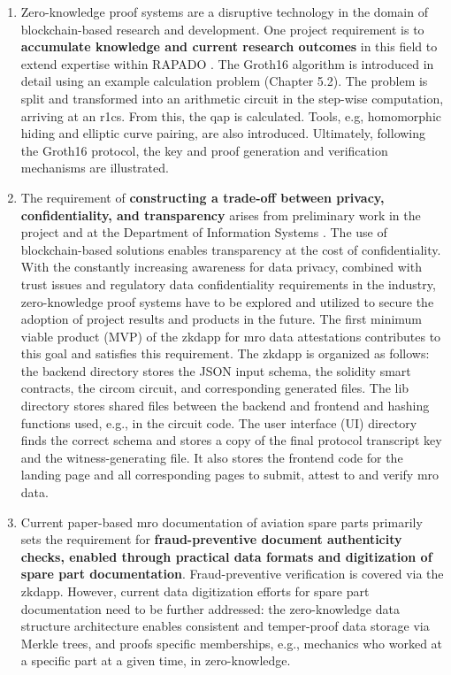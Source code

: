 \begin{enumerate}
    \item Zero-knowledge proof systems are a disruptive technology in the domain of blockchain-based research and development. One project requirement is to \textbf{accumulate knowledge and current research outcomes} in this field to extend expertise within RAPADO \citep{ZedelJ}. The Groth16 algorithm is introduced in detail using an example calculation problem (Chapter 5.2). The problem is split and transformed into an arithmetic circuit in the step-wise computation, arriving at an \acrshort{r1cs}. From this, the \acrshort{qap} is calculated. Tools, e.g, homomorphic hiding and elliptic curve pairing, are also introduced. Ultimately, following the Groth16 protocol, the key and proof generation and verification mechanisms are illustrated.
    \item The requirement of \textbf{constructing a trade-off between privacy, confidentiality, and transparency} arises from preliminary work in the project and at the Department of Information Systems \citep{ZedelJ}. The use of blockchain-based solutions enables transparency at the cost of confidentiality. With the constantly increasing awareness for data privacy, combined with trust issues and regulatory data confidentiality requirements in the industry, zero-knowledge proof systems have to be explored and utilized to secure the adoption of project results and products in the future. The first minimum viable product (MVP) of the \acrshort{zkdapp} for \acrshort{mro} data attestations contributes to this goal and satisfies this requirement. The \acrshort{zkdapp} is organized as follows: the backend directory stores the JSON input schema, the solidity smart contracts, the circom circuit, and corresponding generated files. The lib directory stores shared files between the backend and frontend and hashing functions used, e.g., in the circuit code. The user interface (UI) directory finds the correct schema and stores a copy of the final protocol transcript key and the witness-generating file. It also stores the frontend code for the landing page and all corresponding pages to submit, attest to and verify \acrshort{mro} data.
    \item Current paper-based \acrshort{mro} documentation of aviation spare parts primarily sets the requirement for \textbf{fraud-preventive document authenticity checks, enabled through practical data formats and digitization of spare part documentation}. Fraud-preventive verification is covered via the \acrshort{zkdapp}. However, current data digitization efforts for spare part documentation need to be further addressed: the zero-knowledge data structure architecture enables consistent and temper-proof data storage via Merkle trees, and proofs specific memberships, e.g., mechanics who worked at a specific part at a given time, in zero-knowledge.
\end{enumerate}


